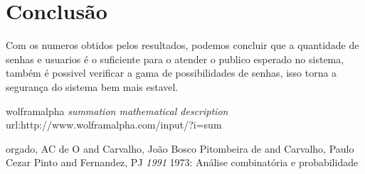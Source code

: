 \documentclass[]{article}
\begin{document}

\section{Conclusão}
Com os numeros obtidos pelos resultados, podemos concluir que a quantidade de senhas e usuarios é o suficiente para o atender o publico esperado no sistema, também é possivel verificar a gama de possibilidades de senhas, isso torna a segurança do sistema bem mais estavel.
  \begin{thebibliography}{1}

   wolframalpha {\em summation mathematical description}\\			   url:http://www.wolframalpha.com/input/?i=sum
   
   orgado, AC de O and Carvalho, Jo{\~a}o Bosco Pitombeira de and Carvalho, Paulo Cezar Pinto and Fernandez, PJ {\em 1991} 1973:
  An{\'a}lise combinat{\'o}ria e probabilidade

  
  \end{thebibliography}
\end{document}
